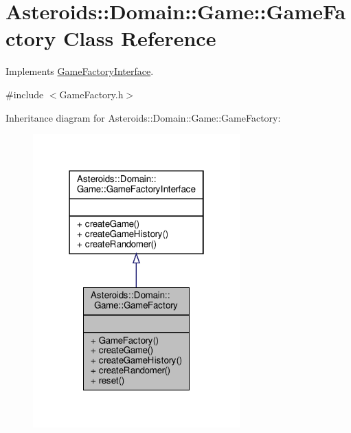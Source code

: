 \hypertarget{classAsteroids_1_1Domain_1_1Game_1_1GameFactory}{}\section{Asteroids\+:\+:Domain\+:\+:Game\+:\+:Game\+Factory Class Reference}
\label{classAsteroids_1_1Domain_1_1Game_1_1GameFactory}


Implements \hyperlink{classAsteroids_1_1Domain_1_1Game_1_1GameFactoryInterface}{Game\+Factory\+Interface}.  




{\ttfamily \#include $<$Game\+Factory.\+h$>$}



Inheritance diagram for Asteroids\+:\+:Domain\+:\+:Game\+:\+:Game\+Factory\+:\nopagebreak
\begin{figure}[H]
\begin{center}
\leavevmode
\includegraphics[width=226pt]{classAsteroids_1_1Domain_1_1Game_1_1GameFactory__inherit__graph}
\end{center}
\end{figure}


